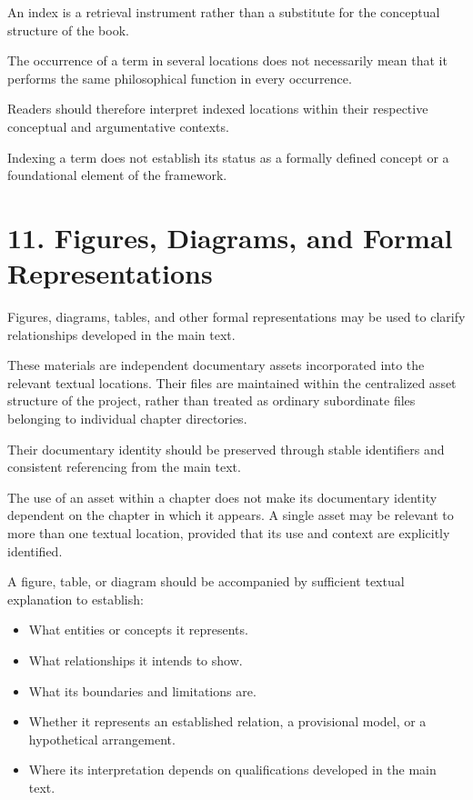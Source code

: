 An index is a retrieval instrument rather
than a substitute for the conceptual structure
of the book.

The occurrence of a term in several locations
does not necessarily mean that it performs
the same philosophical function in every
occurrence.

Readers should therefore interpret indexed
locations within their respective conceptual
and argumentative contexts.

Indexing a term does not establish its status
as a formally defined concept or a foundational
element of the framework.


\section*{11. Figures, Diagrams, and Formal Representations}

Figures, diagrams, tables, and other formal
representations may be used to clarify
relationships developed in the main text.

These materials are independent documentary
assets incorporated into the relevant textual
locations. Their files are maintained within
the centralized asset structure of the project,
rather than treated as ordinary subordinate
files belonging to individual chapter directories.

Their documentary identity should be preserved
through stable identifiers and consistent
referencing from the main text.

The use of an asset within a chapter does not
make its documentary identity dependent on
the chapter in which it appears. A single
asset may be relevant to more than one textual
location, provided that its use and context
are explicitly identified.

A figure, table, or diagram should be accompanied
by sufficient textual explanation to establish:

\begin{itemize}
    \item What entities or concepts it represents.
    \item What relationships it intends to show.
    \item What its boundaries and limitations are.
    \item Whether it represents an established
    relation, a provisional model, or a
    hypothetical arrangement.
    \item Where its interpretation depends on
    qualifications developed in the main text.
\end{itemize}

